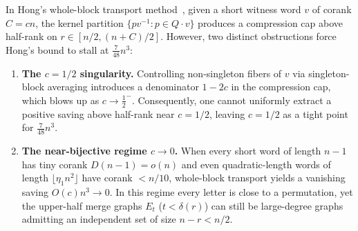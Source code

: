 \documentclass[11pt]{article}
\theoremstyle{definition}
\theoremstyle{remark}
\begin{document}
In Hong's whole-block transport method~\cite{Hong2026b}, given a short witness word $v$ of corank $C = c n$, the kernel partition $\{p v^{-1} : p \in Q \cdot v\}$ produces a compression cap above half-rank on $r \in [n/2, (n+C)/2]$. However, two distinct obstructions force Hong's bound to stall at $\frac{7}{48} n^3$:
\begin{enumerate}[label=(\roman*), leftmargin=2em]
  \item \textbf{The $c = 1/2$ singularity.} Controlling non-singleton fibers of $v$ via singleton-block averaging introduces a denominator $1 - 2c$ in the compression cap, which blows up as $c \to \frac{1}{2}^-$. Consequently, one cannot uniformly extract a positive saving above half-rank near $c = 1/2$, leaving $c = 1/2$ as a tight point for $\frac{7}{48} n^3$.
  \item \textbf{The near-bijective regime $c \to 0$.} When every short word of length $n-1$ has tiny corank $D(n-1) = o(n)$ and even quadratic-length words of length $\lfloor \eta_1 n^2 \rfloor$ have corank $< n/10$, whole-block transport yields a vanishing saving $O(c) n^3 \to 0$. In this regime every letter is close to a permutation, yet the upper-half merge graphs $E_t$ ($t < \delta(r)$) can still be large-degree graphs admitting an independent set of size $n - r < n/2$.
\end{enumerate}
\end{document}
